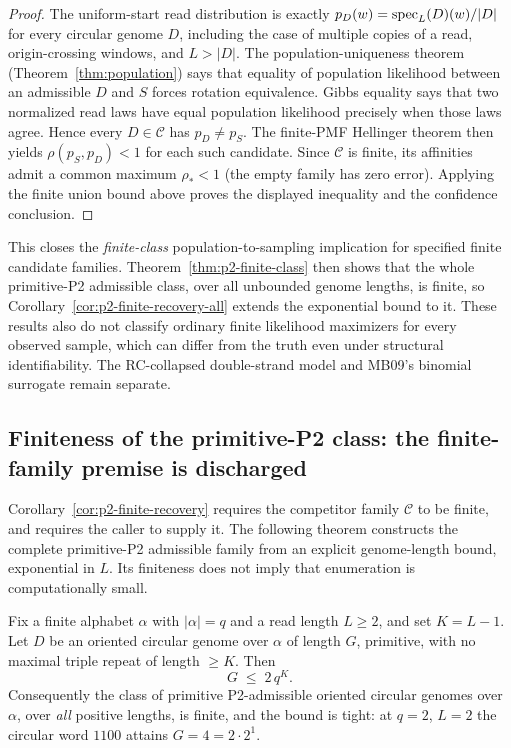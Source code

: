 \begin{proof}
The uniform-start read distribution is exactly
$p_D(w)=\operatorname{spec}_L(D)(w)/|D|$ for every circular genome $D$, including the
case of multiple copies of a read, origin-crossing windows, and $L>|D|$.
The population-uniqueness theorem
(Theorem~\ref{thm:population}) says that equality of
population likelihood between an admissible $D$ and $S$ forces rotation
equivalence.  Gibbs equality says that two normalized read laws have
equal population likelihood precisely when those laws agree.  Hence
every $D\in\mathcal C$ has $p_D\neq p_S$.
The finite-PMF Hellinger theorem then yields
$\rho(p_S,p_D)<1$ for each such candidate.  Since $\mathcal C$ is
finite, its affinities admit a common maximum $\rho_*<1$ (the empty
family has zero error).  Applying the finite union bound above proves
the displayed inequality and the confidence conclusion.
\end{proof}



This closes the \emph{finite-class} population-to-sampling implication
for specified finite candidate families.  Theorem~\ref{thm:p2-finite-class} then shows
that the whole primitive-P2 admissible class, over all unbounded genome
lengths, is finite, so Corollary~\ref{cor:p2-finite-recovery-all} extends the
exponential bound to it.  These results also do not classify ordinary finite
likelihood maximizers for every observed sample, which can differ from
the truth even under structural identifiability.  The RC-collapsed
double-strand model and MB09's binomial surrogate remain separate.

\subsection{Finiteness of the primitive-P2 class: the finite-family premise is discharged}
\label{sec:p2-finite-class}

Corollary~\ref{cor:p2-finite-recovery} requires the competitor family
$\mathcal C$ to be finite, and requires the caller to supply it.  The
following theorem constructs the complete primitive-P2 admissible family
from an explicit genome-length bound, exponential in $L$.  Its finiteness
does not imply that enumeration is computationally small.

\begin{theorem}
\label{thm:p2-finite-class}
Fix a finite alphabet $\alpha$ with $|\alpha|=q$ and a read length
$L\ge2$, and set $K=L-1$.  Let $D$ be an oriented circular genome over
$\alpha$ of length $G$, primitive, with no maximal triple repeat of length
$\ge K$.  Then
\[
  G\;\le\;2\,q^{K}.
\]
Consequently the class of primitive P2-admissible oriented circular genomes
over $\alpha$, over \emph{all} positive lengths, is finite, and the bound is
tight: at $q=2$, $L=2$ the circular word $1100$ attains $G=4=2\cdot2^{1}$.
\end{theorem}

